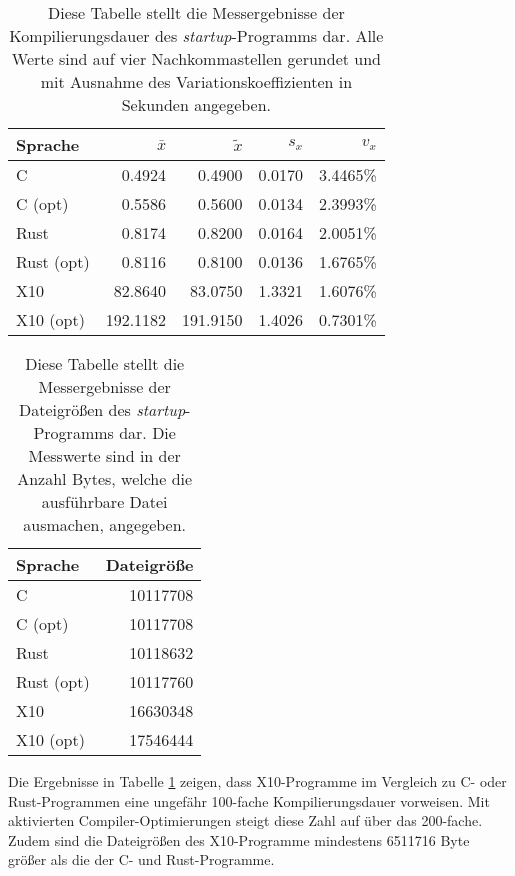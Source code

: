 \begin{table}[hb]
	\begin{center}
		\begin{tabular}{lrrrr}
			\toprule
			Sprache    & $\bar{x}$ & $\tilde{x}$ & $s_x$ & $v_x$\\
			\midrule
			C          &   0.4924 &   0.4900 & 0.0170 & 3.4465\% \\
			C (opt)    &   0.5586 &   0.5600 & 0.0134 & 2.3993\% \\
			Rust       &   0.8174 &   0.8200 & 0.0164 & 2.0051\% \\
			Rust (opt) &   0.8116 &   0.8100 & 0.0136 & 1.6765\% \\
			X10        &  82.8640 &  83.0750 & 1.3321 & 1.6076\% \\
			X10 (opt)  & 192.1182 & 191.9150 & 1.4026 & 0.7301\% \\
			\bottomrule
		\end{tabular}
	\end{center}
	\caption{
		Diese Tabelle stellt die Messergebnisse der Kompilierungsdauer des \textit{startup}-Programms dar.
		Alle Werte sind auf vier Nachkommastellen gerundet und mit Ausnahme des Variationskoeffizienten
		in Sekunden angegeben.
	}
	\label{fig:compile_table}
\end{table}

\begin{table}[hb]
	\begin{center}
		\begin{tabular}{lr}
			\toprule
			Sprache & Dateigröße \\
			\midrule
			C          & 10117708 \\
			C (opt)    & 10117708 \\
			Rust       & 10118632 \\
			Rust (opt) & 10117760 \\
			X10        & 16630348 \\
			X10 (opt)  & 17546444 \\
			\bottomrule
		\end{tabular}
	\end{center}
	\caption{
		Diese Tabelle stellt die Messergebnisse der Dateigrößen des \textit{startup}-Programms dar.
		Die Messwerte sind in der Anzahl Bytes, welche die ausführbare Datei ausmachen, angegeben.
	}
	\label{fig:filesize_table}
\end{table}

Die Ergebnisse in Tabelle \ref{fig:compile_table} zeigen, dass X10-Programme im Vergleich zu C- oder Rust-Programmen
eine ungefähr 100-fache Kompilierungsdauer vorweisen. Mit aktivierten Compiler-Optimierungen steigt diese
Zahl auf über das 200-fache. Zudem sind die Dateigrößen des X10-Programme mindestens 6511716 Byte
größer als die der C- und Rust-Programme.

